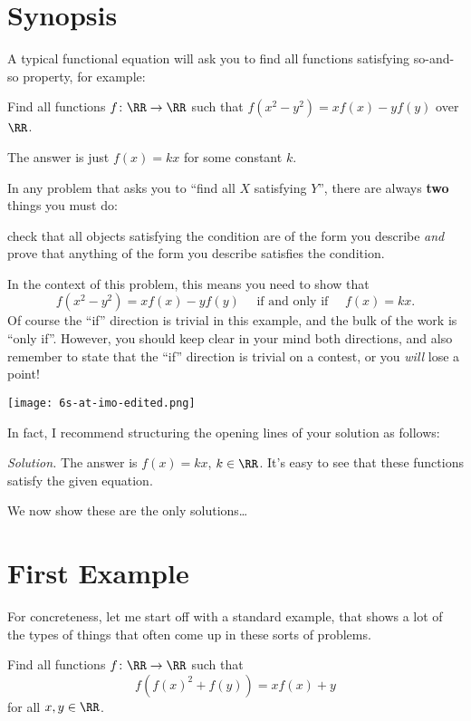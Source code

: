 \documentclass[11pt]{scrartcl}
\begin{document}
\section{Synopsis}
A typical functional equation will ask you to find all functions satisfying so-and-so property, for example:
\begin{example}[USAMO 2002]
  Find all functions $f \colon \RR \to \RR$ such that $f(x^2-y^2) = xf(x) - yf(y)$ over $\RR$.
\end{example}
The answer is just $f(x) = kx$ for some constant $k$.

In any problem that asks you to ``find all $X$ satisfying $Y$'',
there are always \textbf{two} things you must do:
\begin{itemize}
  \ii check that all objects
  satisfying the condition are of the form you describe
  \ii \emph{and} prove that anything of the form
  you describe satisfies the condition.
\end{itemize}
In the context of this problem, this means you need to show that
\[ f(x^2-y^2) = xf(x) - yf(y) \quad\text{ if and only if }\quad f(x) = kx. \]
Of course the ``if'' direction is trivial in this example,
and the bulk of the work is ``only if''.
However, you should keep clear in your mind both directions,
and also remember to state that the ``if'' direction is trivial on a contest,
or you \emph{will} lose a point!
\begin{center}
  \texttt{[image: 6s-at-imo-edited.png]}
\end{center}
In fact, I recommend structuring the opening lines of your solution as follows:
\begin{mdframed}
  \emph{Solution.} The answer is $f(x) = kx$, $k \in \RR$.
  It's easy to see that these functions satisfy
  the given equation.

  We now show these are the only solutions\dots
\end{mdframed}

\section{First Example}
For concreteness, let me start off with a standard example,
that shows a lot of the types of things that often come up in these sorts of problems.
\begin{example}[Kyrgyzstan 2012]
  \label{ex:begin}
  Find all functions $f \colon \RR \to \RR$ such that
  \[ f(f(x)^2+f(y)) = xf(x)+y \]
  for all $x,y \in \RR$.
\end{example}
\end{document}
